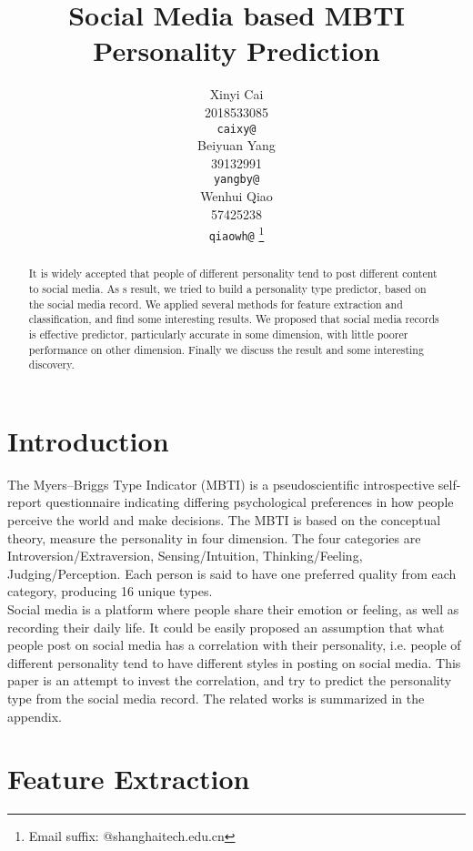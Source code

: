 \documentclass{article}
\title{Social Media based MBTI Personality Prediction}
\author{%
  Xinyi Cai\\
  2018533085\\
  \texttt{caixy@} \\
  \And
  Beiyuan Yang \\
  39132991 \\
  \texttt{yangby@} \\
  \And
  Wenhui Qiao \\
  57425238 \\
  \texttt{qiaowh@} \thanks{Email suffix: @shanghaitech.edu.cn} \\
}
\begin{document}
\maketitle

\begin{abstract}
It is widely accepted that people of different personality tend to post different content to social media. As s result, we tried to build a personality type predictor, based on the social media record. We applied several methods for feature extraction and classification, and find some interesting results. We proposed that social media records is effective predictor, particularly accurate in some dimension, with little poorer performance on other dimension. Finally we discuss the result and some interesting discovery.
\end{abstract}

\section{Introduction}
The Myers–Briggs Type Indicator (MBTI) is a pseudoscientific introspective self-report questionnaire indicating differing psychological preferences in how people perceive the world and make decisions. The MBTI is based on the conceptual theory, measure the personality in four dimension. The four categories are Introversion/Extraversion, Sensing/Intuition, Thinking/Feeling, Judging/Perception. Each person is said to have one preferred quality from each category, producing 16 unique types. \\
Social media is a platform where people share their emotion or feeling, as well as recording their daily life. It could be easily proposed an assumption that what people post on social media has a correlation with their personality, i.e. people of different personality tend to have different styles in posting on social media. This paper is an attempt to invest the correlation, and try to predict the personality type from the social media record. The related works is summarized in the appendix.



\section{Feature Extraction}
\end{document}
